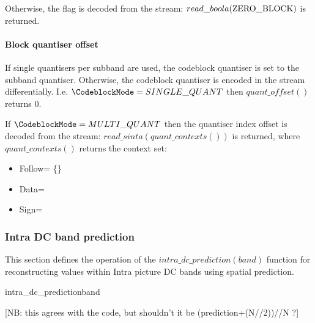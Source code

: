 Otherwise, the flag is decoded from the stream: $read\_boola(\text{ZERO\_BLOCK})$
is returned.

\paragraph{Block quantiser offset\newline}
\label{blockquantidx}

If single quantisers per subband are used, the codeblock quantiser is set to the 
subband quantiser. Otherwise, the codeblock quantiser is encoded in the stream
differentially. I.e. $\CodeblockMode=\SingleQuantiser$ then $quant\_offset()$
returns $0$.

If $\CodeblockMode=\MultipleQuantiser$ then the quantiser index offset
is decoded from the stream: $read\_sinta(quant\_contexts())$ is returned, where
$quant\_contexts()$ returns the context set:

\begin{itemize}
\item{Follow= \{\QOffsetFollow\}}
\item{Data=\QOffsetInfo}
\item{Sign=\QOffsetSign}
\end{itemize}

\subsubsection{Intra DC band prediction}
\label{intradcprediction}

This section defines the operation of the $intra\_dc\_prediction(band)$ function
for reconstructing values within Intra picture DC bands using spatial prediction.

\begin{pseudo}{intra\_dc\_prediction}{band}

      \bsEND
    \bsELSE
      \bsEND
    \bsEND
  \bsEND
\bsEND
\end{pseudo}

[NB: this agrees with the code, but shouldn't it be (prediction+(N//2))//N ?]


